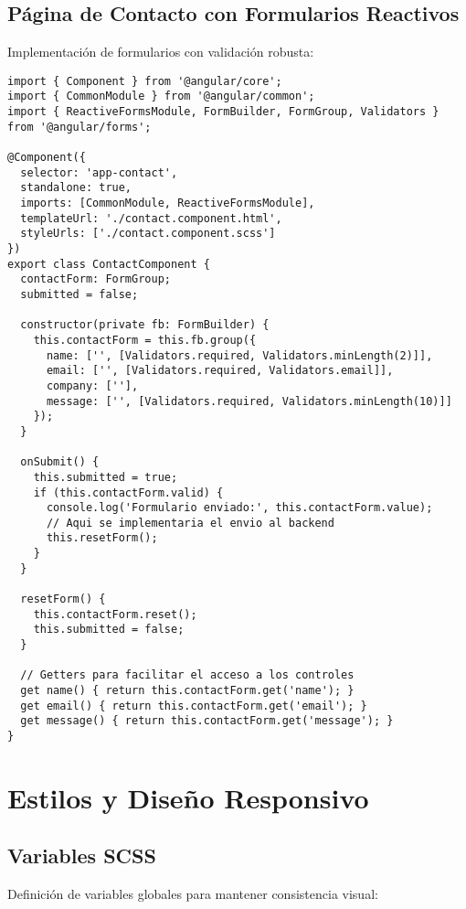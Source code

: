 \subsection{Página de Contacto con Formularios Reactivos}

Implementación de formularios con validación robusta:

\begin{lstlisting}[caption=Contact Component]
import { Component } from '@angular/core';
import { CommonModule } from '@angular/common';
import { ReactiveFormsModule, FormBuilder, FormGroup, Validators } from '@angular/forms';

@Component({
  selector: 'app-contact',
  standalone: true,
  imports: [CommonModule, ReactiveFormsModule],
  templateUrl: './contact.component.html',
  styleUrls: ['./contact.component.scss']
})
export class ContactComponent {
  contactForm: FormGroup;
  submitted = false;

  constructor(private fb: FormBuilder) {
    this.contactForm = this.fb.group({
      name: ['', [Validators.required, Validators.minLength(2)]],
      email: ['', [Validators.required, Validators.email]],
      company: [''],
      message: ['', [Validators.required, Validators.minLength(10)]]
    });
  }

  onSubmit() {
    this.submitted = true;
    if (this.contactForm.valid) {
      console.log('Formulario enviado:', this.contactForm.value);
      // Aqui se implementaria el envio al backend
      this.resetForm();
    }
  }

  resetForm() {
    this.contactForm.reset();
    this.submitted = false;
  }

  // Getters para facilitar el acceso a los controles
  get name() { return this.contactForm.get('name'); }
  get email() { return this.contactForm.get('email'); }
  get message() { return this.contactForm.get('message'); }
}
\end{lstlisting}

\section{Estilos y Diseño Responsivo}

\subsection{Variables SCSS}

Definición de variables globales para mantener consistencia visual:

